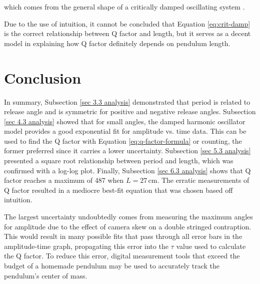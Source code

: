 \documentclass[11pt]{article}
\begin{document}
\begin{multicols}{2}
\noindent which comes from the general shape of a critically damped oscillating system \cite{crit-damping}.

Due to the use of intuition, it cannot be concluded that Equation \ref{eq:crit-damp} is the correct relationship between Q factor and length, but it serves as a decent model in explaining how Q factor definitely depends on pendulum length.

\section{Conclusion}
In summary, Subsection \ref{sec 3.3 analysis} demonstrated that period is related to release angle and is symmetric for positive and negative release angles. Subsection \ref{sec 4.3 analysis} showed that for small angles, the damped harmonic oscillator model provides a good exponential fit for amplitude vs. time data. This can be used to find the Q factor with Equation \ref{eq:q-factor-formula} or counting, the former preferred since it carries a lower uncertainty. Subsection \ref{sec 5.3 analysis} presented a square root relationship between period and length, which was confirmed with a log-log plot. Finally, Subsection \ref{sec 6.3 analysis} shows that Q factor reaches a maximum of 487 when $L = 27\,\text{cm}$. The erratic measurements of Q factor resulted in a mediocre best-fit equation that was chosen based off intuition.

The largest uncertainty undoubtedly comes from measuring the maximum angles for amplitude due to the effect of camera skew on a double stringed contraption. This would result in many possible fits that pass through all error bars in the amplitude-time graph, propagating this error into the $\tau$ value used to calculate the Q factor. To reduce this error, digital measurement tools that exceed the budget of a homemade pendulum may be used to accurately track the pendulum's center of mass.

\newpage

\end{multicols}

\printbibliography[heading=bibintoc]

\newpage

\appendix

% 
\end{document}
